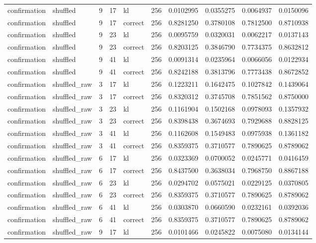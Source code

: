 \begin{tabular}{llrrlrrrrr}
confirmation & shuffled & 9 & 17 & kl & 256 & 0.0102995 & 0.0355275 & 0.0064937 & 0.0150096 \\
confirmation & shuffled & 9 & 17 & correct & 256 & 0.8281250 & 0.3780108 & 0.7812500 & 0.8710938 \\
confirmation & shuffled & 9 & 23 & kl & 256 & 0.0095759 & 0.0320031 & 0.0062217 & 0.0137143 \\
confirmation & shuffled & 9 & 23 & correct & 256 & 0.8203125 & 0.3846790 & 0.7734375 & 0.8632812 \\
confirmation & shuffled & 9 & 41 & kl & 256 & 0.0091314 & 0.0235964 & 0.0066056 & 0.0122934 \\
confirmation & shuffled & 9 & 41 & correct & 256 & 0.8242188 & 0.3813796 & 0.7773438 & 0.8672852 \\
confirmation & shuffled_raw & 3 & 17 & kl & 256 & 0.1223211 & 0.1642475 & 0.1027842 & 0.1439064 \\
confirmation & shuffled_raw & 3 & 17 & correct & 256 & 0.8320312 & 0.3745708 & 0.7851562 & 0.8750000 \\
confirmation & shuffled_raw & 3 & 23 & kl & 256 & 0.1161904 & 0.1502168 & 0.0978093 & 0.1357932 \\
confirmation & shuffled_raw & 3 & 23 & correct & 256 & 0.8398438 & 0.3674693 & 0.7929688 & 0.8828125 \\
confirmation & shuffled_raw & 3 & 41 & kl & 256 & 0.1162608 & 0.1549483 & 0.0975938 & 0.1361182 \\
confirmation & shuffled_raw & 3 & 41 & correct & 256 & 0.8359375 & 0.3710577 & 0.7890625 & 0.8789062 \\
confirmation & shuffled_raw & 6 & 17 & kl & 256 & 0.0323369 & 0.0700052 & 0.0245771 & 0.0416459 \\
confirmation & shuffled_raw & 6 & 17 & correct & 256 & 0.8437500 & 0.3638034 & 0.7968750 & 0.8867188 \\
confirmation & shuffled_raw & 6 & 23 & kl & 256 & 0.0294702 & 0.0575021 & 0.0229125 & 0.0370805 \\
confirmation & shuffled_raw & 6 & 23 & correct & 256 & 0.8359375 & 0.3710577 & 0.7890625 & 0.8789062 \\
confirmation & shuffled_raw & 6 & 41 & kl & 256 & 0.0303870 & 0.0660590 & 0.0232161 & 0.0392036 \\
confirmation & shuffled_raw & 6 & 41 & correct & 256 & 0.8359375 & 0.3710577 & 0.7890625 & 0.8789062 \\
confirmation & shuffled_raw & 9 & 17 & kl & 256 & 0.0101466 & 0.0245822 & 0.0075080 & 0.0134144 \\

\end{tabular}
